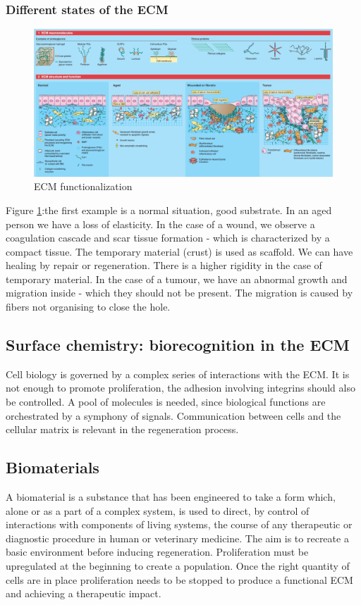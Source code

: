 		\subsubsection{Different states of the ECM}
		\begin{figure}[h]
		\includegraphics[width=1\textwidth]{ECMfunction.png}
		\caption{\label{fig:ECM} ECM functionalization}
		\end{figure}
		\noindent
		Figure \ref{fig:ECM}:the first example is a normal situation, good substrate. In an aged person we have a loss of elasticity. In the case of a wound, we observe a coagulation cascade and scar tissue formation - which is characterized by a compact tissue. The temporary material (crust) is used as scaffold. We can have healing by repair or regeneration. There is a higher rigidity in the case of temporary material. In the case of a tumour, we have an abnormal growth and migration inside - which they should not be present. The migration is caused by fibers not organising to close the hole.

	\subsection{Surface chemistry: biorecognition in the ECM}
	Cell biology is governed by a complex series of interactions with the ECM.
	It is not enough to promote proliferation, the adhesion involving integrins should also be controlled.
	A pool of molecules is needed, since biological functions are orchestrated by a symphony of signals.
	Communication between cells and the cellular matrix is relevant in the regeneration process.

	\subsection{Biomaterials}
	A biomaterial is a substance that has been engineered to take a form which, alone or as a part of a complex system, is used to direct, by control of interactions with components of living systems, the course of any therapeutic or diagnostic procedure in human or veterinary medicine.
	The aim is to recreate a basic environment before inducing regeneration.
	Proliferation must be upregulated at the beginning to create a population.
	Once the right quantity of cells are in place proliferation needs to be stopped to produce a functional ECM and achieving a therapeutic impact.


